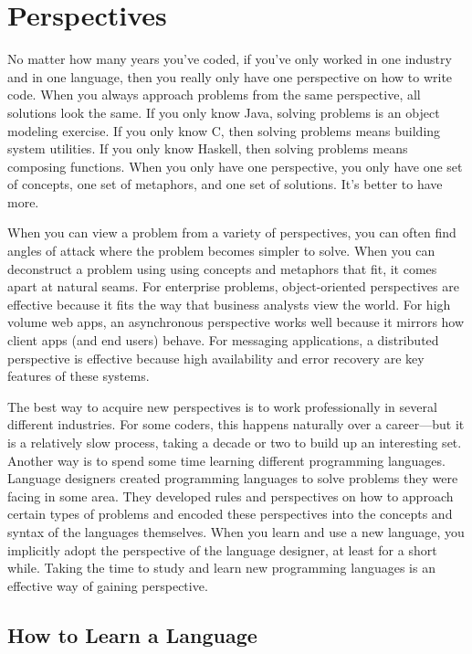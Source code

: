 \chapter{Perspectives}

No matter how many years you've coded, if you've only worked in one industry
and in one language, then you really only have one perspective on how to write
code. When you always approach problems from the same perspective, all
solutions look the same. If you only know Java, solving problems is an object
modeling exercise. If you only know C, then solving problems means building
system utilities. If you only know Haskell, then solving problems means
composing functions. When you only have one perspective, you only have one set
of concepts, one set of metaphors, and one set of solutions. It's better to
have more.

When you can view a problem from a variety of perspectives, you can often find
angles of attack where the problem becomes simpler to solve. When you can
deconstruct a problem using using concepts and metaphors that fit, it comes
apart at natural seams. For enterprise problems, object-oriented perspectives
are effective because it fits the way that business analysts view the world.
For high volume web apps, an asynchronous perspective works well because it
mirrors how client apps (and end users) behave. For messaging applications, a
distributed perspective is effective because high availability and error
recovery are key features of these systems.

The best way to acquire new perspectives is to work professionally in several
different industries. For some coders, this happens naturally over a
career---but it is a relatively slow process, taking a decade or two to build
up an interesting set. Another way is to spend some time learning different
programming languages.  Language designers created programming languages to
solve problems they were facing in some area. They developed rules and
perspectives on how to approach certain types of problems and encoded these
perspectives into the concepts and syntax of the languages themselves. When you
learn and use a new language, you implicitly adopt the perspective of the
language designer, at least for a short while. Taking the time to study and
learn new programming languages is an effective way of gaining perspective.

\section{How to Learn a Language}

